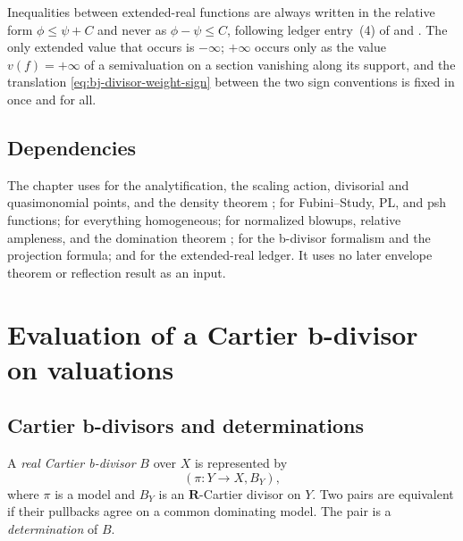 Inequalities between extended-real functions are always written in the
relative form $\phi\leq\psi+C$ and never as $\phi-\psi\leq C$,
following ledger entry~(4) of  and
.  The only extended value that occurs is
$-\infty$; $+\infty$ occurs only as the value $v(f)=+\infty$ of a
semivaluation on a section vanishing along its support, and the
translation \eqref{eq:bj-divisor-weight-sign} between the two sign
conventions is fixed in  once and for all.

\subsection{Dependencies}
\label{sec:ch38-dependencies}

The chapter uses  for the
analytification, the scaling action, divisorial and quasimonomial points,
and the density theorem ;
 for Fubini--Study, PL, and psh functions;
 for everything homogeneous;
 for normalized blowups, relative
ampleness, and the domination theorem
;
 for the b-divisor formalism and the
projection formula; and  for the
extended-real ledger. It uses no later envelope theorem or
reflection result as an input.

\section{Evaluation of a Cartier b-divisor on valuations}
\label{sec:ch38-evaluation}

\subsection{Cartier b-divisors and determinations}
\label{sec:ch38-cartier-bdivisors}

\begin{definition}
\label{def:bj-real-cartier-bdivisor}
A \emph{real Cartier b-divisor} $B$ over $X$ is represented by
\[
                     (\pi:Y\longrightarrow X,B_Y),
\]
where $\pi$ is a model and $B_Y$ is an $\mathbf R$-Cartier divisor
on $Y$.  Two pairs are equivalent if their pullbacks agree on a common
dominating model.  The pair is a \emph{determination} of $B$.
\end{definition}

